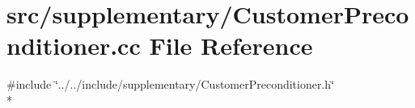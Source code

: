 \section{src/supplementary/\-Customer\-Preconditioner.cc File Reference}
\label{_customer_preconditioner_8cc}
{\ttfamily \#include \char`\"{}../../include/supplementary/\-Customer\-Preconditioner.\-h\char`\"{}}\\*
